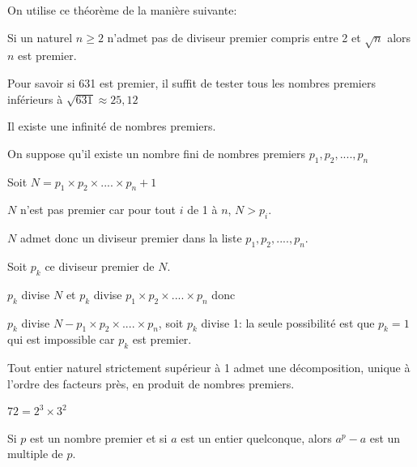 \documentclass[french]{book}
\begin{document}
\begin{rem}
On utilise ce théorème de la manière suivante:

Si un naturel $n\geq 2$ n'admet pas de diviseur premier compris entre 2 et $\sqrt{n}$ alors $n$ est premier.

\end{rem}

\begin{exemple}

Pour savoir si 631 est premier, il suffit de tester tous les nombres premiers inférieurs à $\sqrt{631}\approx25,12$

\end{exemple}

\begin{thm}
Il existe une infinité de nombres premiers.
\end{thm}

\begin{demo}

On suppose qu'il existe un nombre fini de nombres premiers $p_{1}, p_{2}, .... ,p_{n}$


Soit $N=p_{1}\times p_{2}\times .... \times p_{n}+1$

$N$ n'est pas premier car pour tout $i$ de 1 à $n$, $N> p_{i}$.

 $N$ admet donc un diviseur premier dans la liste $p_{1}, p_{2}, .... ,p_{n}$. 

Soit $p_{k}$ ce diviseur premier de $N$.

$p_{k}$ divise $N$ et $p_{k}$ divise $p_{1}\times p_{2}\times .... \times p_{n}$ donc

$p_{k}$ divise $N-p_{1}\times p_{2}\times .... \times p_{n}$, soit $p_{k}$ divise 1: la seule possibilité est que $p_{k}=1$ qui est impossible car $p_{k}$ est premier.

\end{demo}

\begin{thm}

Tout entier naturel strictement supérieur à 1 admet une décomposition, unique à l'ordre des facteurs près, en produit de nombres premiers.

\end{thm}

\begin{exemple}

$72=2^{3}\times 3^{2}$
\end{exemple}


\begin{thm}
Si $p$ est un nombre premier et si $a$ est un entier quelconque, alors $a^p-a$ est un multiple de $p$.
\end{thm}
\end{document}

